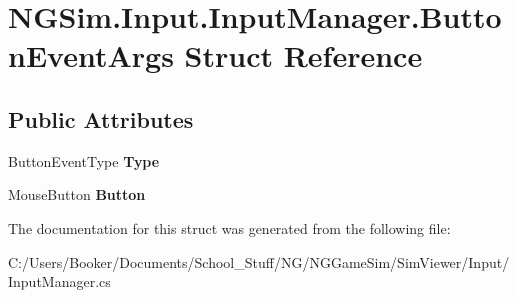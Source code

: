 \hypertarget{struct_n_g_sim_1_1_input_1_1_input_manager_1_1_button_event_args}{}\section{N\+G\+Sim.\+Input.\+Input\+Manager.\+Button\+Event\+Args Struct Reference}
\label{struct_n_g_sim_1_1_input_1_1_input_manager_1_1_button_event_args}
\subsection*{Public Attributes}
\begin{DoxyCompactItemize}
\item 
\mbox{\label{struct_n_g_sim_1_1_input_1_1_input_manager_1_1_button_event_args_a367b55d5e489804e35f369f692ea2b96}} 
Button\+Event\+Type {\bfseries Type}
\item 
\mbox{\label{struct_n_g_sim_1_1_input_1_1_input_manager_1_1_button_event_args_a5476e1e249161e697bc47d2c793b6d8a}} 
Mouse\+Button {\bfseries Button}
\end{DoxyCompactItemize}


The documentation for this struct was generated from the following file\+:\begin{DoxyCompactItemize}
\item 
C\+:/\+Users/\+Booker/\+Documents/\+School\+\_\+\+Stuff/\+N\+G/\+N\+G\+Game\+Sim/\+Sim\+Viewer/\+Input/Input\+Manager.\+cs\end{DoxyCompactItemize}
